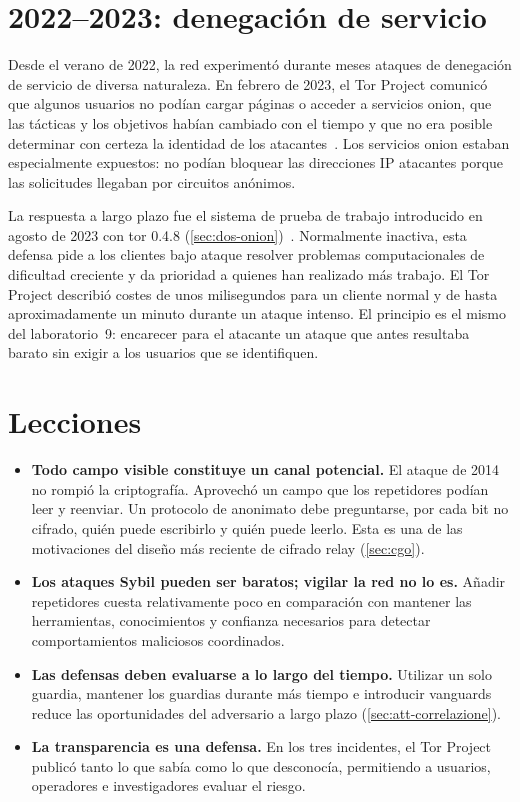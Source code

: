\section{2022--2023: denegación de servicio}\label{sec:casi-dos}

Desde el verano de 2022, la red experimentó durante meses ataques de denegación de servicio de diversa naturaleza. En febrero de 2023, el Tor Project comunicó que algunos usuarios no podían cargar páginas o acceder a servicios onion, que las tácticas y los objetivos habían cambiado con el tiempo y que no era posible determinar con certeza la identidad de los atacantes~\cite{torblog2023dos}. Los servicios onion estaban especialmente expuestos: no podían bloquear las direcciones IP atacantes porque las solicitudes llegaban por circuitos anónimos.

La respuesta a largo plazo fue el sistema de prueba de trabajo introducido en agosto de 2023 con tor 0.4.8 (\cref{sec:dos-onion})~\cite{torblog2023pow}. Normalmente inactiva, esta defensa pide a los clientes bajo ataque resolver problemas computacionales de dificultad creciente y da prioridad a quienes han realizado más trabajo. El Tor Project describió costes de unos milisegundos para un cliente normal y de hasta aproximadamente un minuto durante un ataque intenso. El principio es el mismo del laboratorio~9: encarecer para el atacante un ataque que antes resultaba barato sin exigir a los usuarios que se identifiquen.

\section{Lecciones}\label{sec:casi-lezioni}

\begin{itemize}
  \item \textbf{Todo campo visible constituye un canal potencial.} El ataque de 2014 no rompió la criptografía. Aprovechó un campo que los repetidores podían leer y reenviar. Un protocolo de anonimato debe preguntarse, por cada bit no cifrado, quién puede escribirlo y quién puede leerlo. Esta es una de las motivaciones del diseño más reciente de cifrado relay (\cref{sec:cgo}).
  \item \textbf{Los ataques Sybil pueden ser baratos; vigilar la red no lo es.} Añadir repetidores cuesta relativamente poco en comparación con mantener las herramientas, conocimientos y confianza necesarios para detectar comportamientos maliciosos coordinados.
  \item \textbf{Las defensas deben evaluarse a lo largo del tiempo.} Utilizar un solo guardia, mantener los guardias durante más tiempo e introducir vanguards reduce las oportunidades del adversario a largo plazo (\cref{sec:att-correlazione}).
  \item \textbf{La transparencia es una defensa.} En los tres incidentes, el Tor Project publicó tanto lo que sabía como lo que desconocía, permitiendo a usuarios, operadores e investigadores evaluar el riesgo.
\end{itemize}

